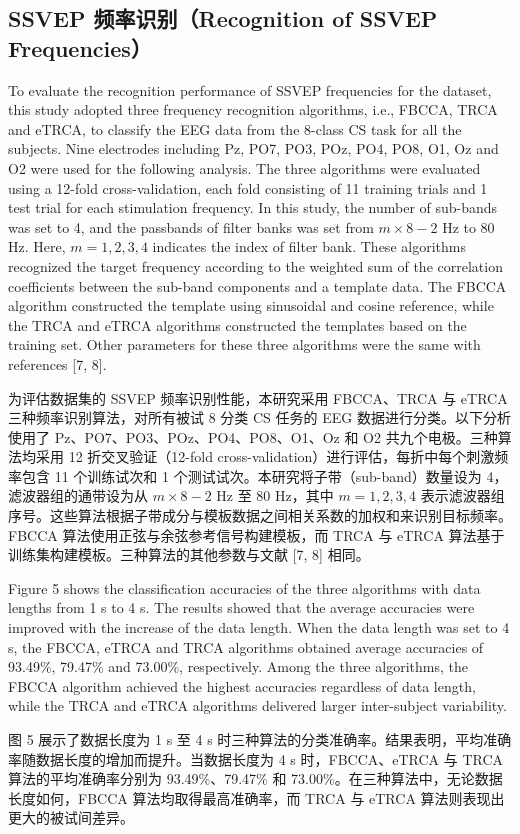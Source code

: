 \documentclass[11pt]{ctexart}
\newenvironment{en}{\begin{enbox}\color{black!85}}{\end{enbox}}
\newenvironment{zh}{\begin{zhbox}}{\end{zhbox}}
\begin{document}
\subsection{SSVEP 频率识别（Recognition of SSVEP Frequencies）}
\begin{en}
To evaluate the recognition performance of SSVEP frequencies for the dataset, this study adopted three frequency recognition algorithms, i.e., FBCCA, TRCA and eTRCA, to classify the EEG data from the 8-class CS task for all the subjects. Nine electrodes including Pz, PO7, PO3, POz, PO4, PO8, O1, Oz and O2 were used for the following analysis. The three algorithms were evaluated using a 12-fold cross-validation, each fold consisting of 11 training trials and 1 test trial for each stimulation frequency. In this study, the number of sub-bands was set to 4, and the passbands of filter banks was set from $m\times8-2$ Hz to 80 Hz. Here, $m=1,2,3,4$ indicates the index of filter bank. These algorithms recognized the target frequency according to the weighted sum of the correlation coefficients between the sub-band components and a template data. The FBCCA algorithm constructed the template using sinusoidal and cosine reference, while the TRCA and eTRCA algorithms constructed the templates based on the training set. Other parameters for these three algorithms were the same with references [7, 8].
\end{en}
\begin{zh}
为评估数据集的 SSVEP 频率识别性能，本研究采用 FBCCA、TRCA 与 eTRCA 三种频率识别算法，对所有被试 8 分类 CS 任务的 EEG 数据进行分类。以下分析使用了 Pz、PO7、PO3、POz、PO4、PO8、O1、Oz 和 O2 共九个电极。三种算法均采用 12 折交叉验证（12-fold cross-validation）进行评估，每折中每个刺激频率包含 11 个训练试次和 1 个测试试次。本研究将子带（sub-band）数量设为 4，滤波器组的通带设为从 $m\times8-2$ Hz 至 80 Hz，其中 $m=1,2,3,4$ 表示滤波器组序号。这些算法根据子带成分与模板数据之间相关系数的加权和来识别目标频率。FBCCA 算法使用正弦与余弦参考信号构建模板，而 TRCA 与 eTRCA 算法基于训练集构建模板。三种算法的其他参数与文献 [7, 8] 相同。
\end{zh}

\begin{en}
Figure 5 shows the classification accuracies of the three algorithms with data lengths from 1 s to 4 s. The results showed that the average accuracies were improved with the increase of the data length. When the data length was set to 4 s, the FBCCA, eTRCA and TRCA algorithms obtained average accuracies of 93.49\%, 79.47\% and 73.00\%, respectively. Among the three algorithms, the FBCCA algorithm achieved the highest accuracies regardless of data length, while the TRCA and eTRCA algorithms delivered larger inter-subject variability.
\end{en}
\begin{zh}
图 5 展示了数据长度为 1 s 至 4 s 时三种算法的分类准确率。结果表明，平均准确率随数据长度的增加而提升。当数据长度为 4 s 时，FBCCA、eTRCA 与 TRCA 算法的平均准确率分别为 93.49\%、79.47\% 和 73.00\%。在三种算法中，无论数据长度如何，FBCCA 算法均取得最高准确率，而 TRCA 与 eTRCA 算法则表现出更大的被试间差异。
\end{zh}
\end{document}

